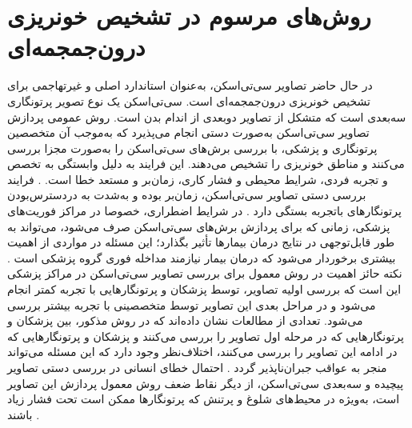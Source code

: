   
\section{روش‌های مرسوم در تشخیص خونریزی درون‌جمجمه‌ای}

در حال حاضر تصاویر سی‌تی‌اسکن، به‌عنوان استاندارد اصلی و غیرتهاجمی
برای تشخیص خونریزی‌ درون‌جمجمه‌ای است. سی‌تی‌اسکن یک نوع تصویر پرتونگاری
سه‌بعدی است که متشکل از تصاویر دوبعدی از اندام بدن است. روش عمومی پردازش تصاویر سی‌تی‌اسکن به‌صورت دستی انجام می‌پذیرد که به‌موجب آن متخصصین پرتونگاری
 و پزشکی، با بررسی برش‌های
سی‌تی‌اسکن را به‌صورت مجزا بررسی می‌کنند و مناطق خونریزی را تشخیص می‌دهند. این فرایند به دلیل وابستگی به تخصص و تجربه فردی، شرایط محیطی و فشار کاری، زمان‌بر و مستعد خطا است. \cite{arbabshirani2018advanced,grewal2018radnet,ye2019precise,chilamkurthy2018deep,kuo2019expert}.
فرایند بررسی دستی تصاویر سی‌تی‌اسکن، زمان‌بر بوده و به‌شدت به دردسترس‌بودن پرتونگار‌های 
باتجربه بستگی دارد \cite{burduja2020accurate}.
 در شرایط اضطراری، خصوصا در مراکز فوریت‌های پزشکی، زمانی که برای پردازش برش‌های سی‌تی‌اسکن صرف می‌شود، می‌تواند به طور قابل‌توجهی در نتایج درمان بیمارها تأثیر بگذارد؛ این مسئله در مواردی از اهمیت بیشتری برخوردار می‌شود که درمان بیمار نیازمند مداخله فوری گروه پزشکی است \cite{chilamkurthy2018deep}. نکته حائز اهمیت در روش معمول برای بررسی تصاویر سی‌تی‌اسکن در مراکز پزشکی این است که بررسی اولیه تصاویر، توسط پزشکان و پرتونگار‌هایی با تجربه کمتر انجام می‌شود و در مراحل بعدی این تصاویر توسط متخصصینی با تجربه بیشتر بررسی می‌شود. تعدادی از مطالعات نشان داده‌اند که در روش مذکور،‌ بین پزشکان و پرتونگار‌هایی که در مرحله اول تصاویر را بررسی می‌کنند و پزشکان و پرتونگار‌هایی که در ادامه این تصاویر را بررسی می‌کنند،‌ اختلاف‌نظر وجود دارد که این مسئله می‌تواند منجر به عواقب جبران‌ناپذیر گردد
\cite{ye2019precise, alfaro1995accuracy, lal2000clinical, erly2002radiology, strub2007overnight}.
   احتمال خطای انسانی در بررسی دستی تصاویر پیچیده و سه‌بعدی سی‌تی‌اسکن، از دیگر نقاط ضعف روش معمول پردازش این تصاویر است، به‌ویژه در محیط‌های شلوغ و پرتنش که پرتونگار‌ها ممکن است تحت فشار زیاد باشند \cite{ye2019precise}.
   
